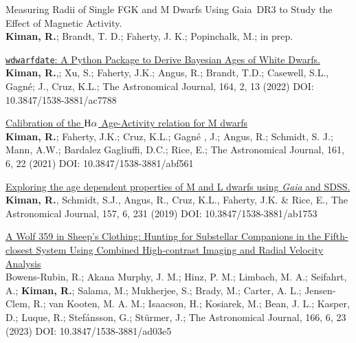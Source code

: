 \documentclass[10pt]{cv}
\begin{document}
\begin{llist}
\begin{etaremune}
  \item Measuring Radii of Single FGK and M Dwarfs Using Gaia~DR3 to Study the Effect of Magnetic Activity.\\ \textbf{Kiman, R.}; Brandt, T. D.; Faherty, J. K.; Popinchalk, M.; in prep.
  \item \href{https://ui.adsabs.harvard.edu/abs/2022AJ....164...62K/abstract}{\texttt{wdwarfdate}: A Python Package to Derive Bayesian Ages of White Dwarfs.}\\ \textbf{Kiman, R.},; Xu, S.; Faherty, J.K.; Angus, R.; Brandt, T.D.; Casewell, S.L., Gagn\'e; J., Cruz, K.L.; The Astronomical Journal, 164, 2, 13 (2022) DOI: 10.3847/1538-3881/ac7788
  \item \href{https://ui.adsabs.harvard.edu/abs/2021AJ....161..277K/abstract}{Calibration of the ${\rm H}\alpha$ Age-Activity relation for M dwarfs}\\ \textbf{Kiman, R.}; Faherty, J.K.; Cruz, K.L.; Gagn\'e , J.; Angus, R.; Schmidt, S. J.; Mann, A.W.; Bardalez Gagliuffi, D.C.; Rice, E.; The Astronomical Journal, 161, 6, 22 (2021) DOI: 10.3847/1538-3881/abf561
  \item \href{https://ui.adsabs.harvard.edu/abs/2019AJ....157..231K/abstract}{Exploring the age dependent properties of M and L dwarfs using \textit{Gaia} and SDSS.}\\ \textbf{Kiman, R.}, Schmidt, S.J., Angus, R., Cruz, K.L., Faherty, J.K. \& Rice, E., The Astronomical Journal, 157, 6, 231 (2019) DOI: 10.3847/1538-3881/ab1753 
\end{etaremune}





\begin{etaremune}

\item \href{https://ui.adsabs.harvard.edu/abs/2023AJ....166..260B/abstract}{A Wolf 359 in Sheep's Clothing: Hunting for Substellar Companions in the Fifth-closest System Using Combined High-contrast Imaging and Radial Velocity Analysis} \\ Bowens-Rubin, R.; Akana Murphy, J. M.; Hinz, P. M.; Limbach, M. A.; Seifahrt, A.; \textbf{Kiman, R.}; Salama, M.; Mukherjee, S.; Brady, M.; Carter, A. L.; Jensen-Clem, R.; van Kooten, M. A. M.; Isaacson, H.; Kosiarek, M.; Bean, J. L.; Kasper, D.; Luque, R.; Stefánsson, G.; Stürmer, J.; The Astronomical Journal, 166, 6, 23 (2023) DOI: 10.3847/1538-3881/ad03e5



\end{etaremune}
\end{llist}
\end{document}
